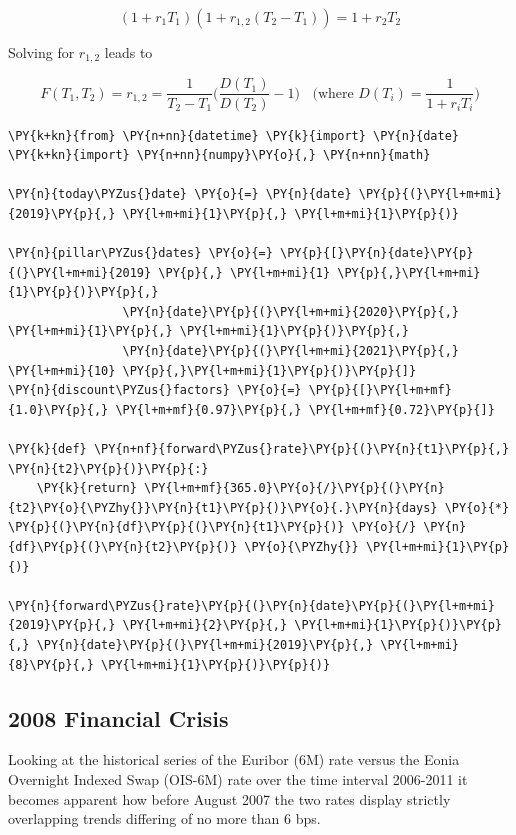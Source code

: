 \[(1+r_1 T_1)(1+r_{1,2}(T_2 - T_1)) = 1 + r_2 T_2\]

Solving for \(r_{1,2}\) leads to

\[F(T_1, T_2) = r_{1,2} = \frac{1}{T_2-T_1}\Big(\frac{D(T_1)}{D(T_2)} - 1 \Big)~~~~\textrm{(where $D{(T_i)}=\frac{1}{1+r_iT_{i}}$)}\]

\begin{tcolorbox}[breakable, size=fbox, boxrule=1pt, pad at break*=1mm,colback=cellbackground, colframe=cellborder]
\begin{Verbatim}[commandchars=\\\{\}]
\PY{k+kn}{from} \PY{n+nn}{datetime} \PY{k}{import} \PY{n}{date}
\PY{k+kn}{import} \PY{n+nn}{numpy}\PY{o}{,} \PY{n+nn}{math}

\PY{n}{today\PYZus{}date} \PY{o}{=} \PY{n}{date} \PY{p}{(}\PY{l+m+mi}{2019}\PY{p}{,} \PY{l+m+mi}{1}\PY{p}{,} \PY{l+m+mi}{1}\PY{p}{)}

\PY{n}{pillar\PYZus{}dates} \PY{o}{=} \PY{p}{[}\PY{n}{date}\PY{p}{(}\PY{l+m+mi}{2019} \PY{p}{,} \PY{l+m+mi}{1} \PY{p}{,}\PY{l+m+mi}{1}\PY{p}{)}\PY{p}{,} 
                \PY{n}{date}\PY{p}{(}\PY{l+m+mi}{2020}\PY{p}{,} \PY{l+m+mi}{1}\PY{p}{,} \PY{l+m+mi}{1}\PY{p}{)}\PY{p}{,} 
                \PY{n}{date}\PY{p}{(}\PY{l+m+mi}{2021}\PY{p}{,} \PY{l+m+mi}{10} \PY{p}{,}\PY{l+m+mi}{1}\PY{p}{)}\PY{p}{]}
\PY{n}{discount\PYZus{}factors} \PY{o}{=} \PY{p}{[}\PY{l+m+mf}{1.0}\PY{p}{,} \PY{l+m+mf}{0.97}\PY{p}{,} \PY{l+m+mf}{0.72}\PY{p}{]}

\PY{k}{def} \PY{n+nf}{forward\PYZus{}rate}\PY{p}{(}\PY{n}{t1}\PY{p}{,} \PY{n}{t2}\PY{p}{)}\PY{p}{:}
    \PY{k}{return} \PY{l+m+mf}{365.0}\PY{o}{/}\PY{p}{(}\PY{n}{t2}\PY{o}{\PYZhy{}}\PY{n}{t1}\PY{p}{)}\PY{o}{.}\PY{n}{days} \PY{o}{*} \PY{p}{(}\PY{n}{df}\PY{p}{(}\PY{n}{t1}\PY{p}{)} \PY{o}{/} \PY{n}{df}\PY{p}{(}\PY{n}{t2}\PY{p}{)} \PY{o}{\PYZhy{}} \PY{l+m+mi}{1}\PY{p}{)}

\PY{n}{forward\PYZus{}rate}\PY{p}{(}\PY{n}{date}\PY{p}{(}\PY{l+m+mi}{2019}\PY{p}{,} \PY{l+m+mi}{2}\PY{p}{,} \PY{l+m+mi}{1}\PY{p}{)}\PY{p}{,} \PY{n}{date}\PY{p}{(}\PY{l+m+mi}{2019}\PY{p}{,} \PY{l+m+mi}{8}\PY{p}{,} \PY{l+m+mi}{1}\PY{p}{)}\PY{p}{)}
\end{Verbatim}
\end{tcolorbox}

\subsection{2008 Financial Crisis}\label{financial-crisis}

Looking at the historical series of the Euribor (6M) rate versus the Eonia Overnight Indexed Swap (OIS-6M) rate over the time interval 2006-2011 it becomes apparent how before August 2007 the two rates display strictly overlapping trends differing of no more than 6 bps.

